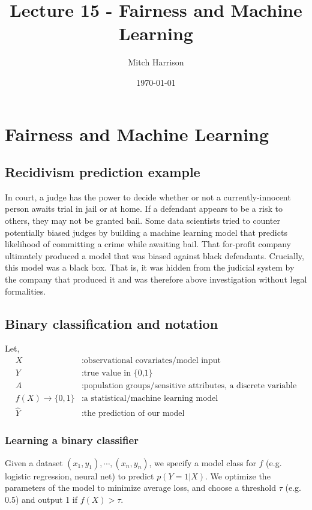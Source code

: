 \documentclass[titlepage, 12pt, leqno]{article}
\title{\Huge{Lecture 15 - Fairness and Machine Learning}}
\author{\large{Mitch Harrison}}
\date{\today}
\begin{document}
\setlength{\parskip}{1\baselineskip}
\setlength{\parindent}{15pt}
\maketitle
\tableofcontents
\newpage


\section{Fairness and Machine Learning}

\subsection{Recidivism prediction example}
In court, a judge has the power to decide whether or not a currently-innocent
person awaits trial in jail or at home. If a defendant appears to be a risk to
others, they may not be granted bail. Some data scientists tried to counter
potentially biased judges by building a machine learning model that predicts
likelihood of committing a crime while awaiting bail. That for-profit company
ultimately produced a model that was biased against black defendants. 
Crucially, this model was a black box. That is, it was hidden from the judicial
system by the company that produced it and was therefore above investigation 
without legal formalities.

\subsection{Binary classification and notation}
Let,
\begin{align*}
    X &: \text{observational covariates/model input}\\
    Y &: \text{true value in \{0,1\}}\\
    A &: \text{population groups/sensitive attributes, a discrete variable}\\
    f(X) \rightarrow \{0,1\} &: \text{a statistical/machine learning model}\\
    \hat Y &: \text{the prediction of our model}
\end{align*}

\subsubsection{Learning a binary classifier}
Given a dataset $(x_{1},y_{1}), \cdots , (x_{n}, y_{n})$, we specify a model
class for $f$ (e.g. logistic regression, neural net) to predict
$p(Y=1|X)$. We optimize the parameters of the model to minimize average loss, 
and choose a threshold $\tau$ (e.g. 0.5) and output 1 if $f(X) > \tau$.
\end{document}
